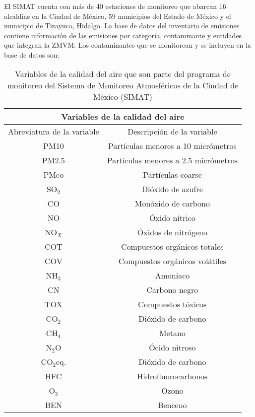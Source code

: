 El SIMAT cuenta con más de 40 estaciones de monitoreo que abarcan 16 alcaldias en la Ciudad de México, 59 municipios del Estado de México y el municipio de Tizayuca, Hidalgo. La base de datos del inventario de emisiones contiene información de las emisiones por categoría, contaminante y entidades que integran la ZMVM. Los contaminantes que se monitorean y se incluyen en la base de datos son:

\FloatBarrier
\begin{table}
    \centering
    \caption{Variables de la calidad del aire que son parte del programa de monitoreo del Sistema de Monitoreo Atmosféricos de la Ciudad de México (SIMAT)}
    \label{tab:aire}
    \begin{tabular}{ | c | c | }
        \hline
        \multicolumn{2}{|c|}{Variables de la calidad del aire} \\
        \hline
        Abreviatura de la variable & Descripción de la variable \\
        \hline
        PM10        & Partículas menores a 10 micrómetros \\ 
        PM2.5       & Partículas menores a 2.5 micrómetros \\  
        PMco        & Partículas coarse \\
        SO$_{2}$    & Dióxido de azufre \\  
        CO          & Monóxido de carbono \\  
        NO          & Óxido nítrico \\
        NO$_{X}$    & Óxidos de nitrógeno \\  
        COT         & Compuestos orgánicos totales \\  
        COV         & Compuestos orgánicos volátiles \\  
        NH$_{3}$    & Amoniaco \\  
        CN          & Carbono negro \\  
        TOX         & Compuestos tóxicos \\  
        CO$_{2}$    & Dióxido de carbono \\  
        CH$_{4}$    & Metano \\  
        N$_{2}$O    & Ócido nitroso \\  
        CO$_{2}$eq. & Dióxido de carbono \\  
        HFC         & Hidrofluorocarbonos \\
        O$_3$       & Ozono \\
        BEN         & Benceno \\

\end{tabular}
\end{table}

